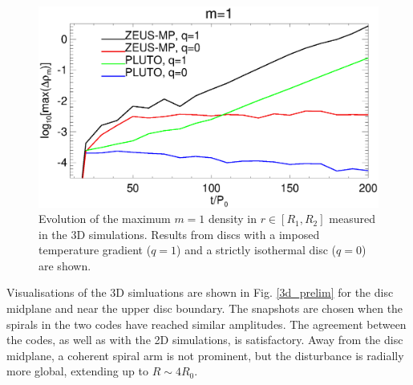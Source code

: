 
\begin{figure}
  \includegraphics[width=\linewidth]{figures/m1_analysis_plot_ampmax3d.ps}
  \caption{Evolution of the maximum $m=1$ density in  $r\in[R_1,R_2]$
    measured in the 3D simulations. Results from discs with a imposed 
    temperature gradient ($q=1$) and a strictly isothermal disc
    ($q=0$) are shown.  
    \label{3d_ampmax}}   
\end{figure}

Visualisations of the 3D simluations are shown in   
Fig. \ref{3d_prelim} for the disc midplane and near the upper disc
boundary. The snapshots are chosen when the spirals in the two codes
have reached similar amplitudes. The agreement between the codes,
as well as with the 2D simulations, is satisfactory.    
Away from the disc midplane, a coherent spiral arm is
not prominent, but the disturbance is radially more global, extending
up to $R\sim 4R_0$. 

